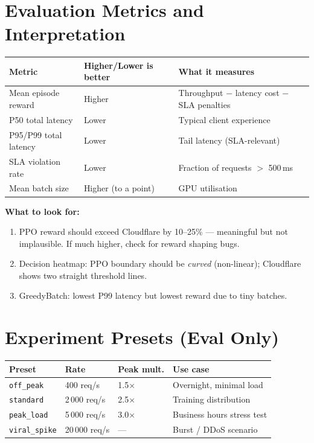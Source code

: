 \documentclass[11pt,a4paper]{article}
\begin{document}
\section{Evaluation Metrics and Interpretation}

\begin{tabular}{@{}lll@{}}
\toprule
\textbf{Metric} & \textbf{Higher/Lower is better} & \textbf{What it measures} \\
\midrule
Mean episode reward & Higher & Throughput $-$ latency cost $-$ SLA penalties \\
P50 total latency & Lower & Typical client experience \\
P95/P99 total latency & Lower & Tail latency (SLA-relevant) \\
SLA violation rate & Lower & Fraction of requests $>$ 500\,ms \\
Mean batch size & Higher (to a point) & GPU utilisation \\
\bottomrule
\end{tabular}

\medskip
\noindent\textbf{What to look for:}
\begin{enumerate}[noitemsep]
  \item PPO reward should exceed Cloudflare by 10--25\% — meaningful but not
        implausible. If much higher, check for reward shaping bugs.
  \item Decision heatmap: PPO boundary should be \emph{curved} (non-linear);
        Cloudflare shows two straight threshold lines.
  \item GreedyBatch: lowest P99 latency but lowest reward due to tiny batches.
\end{enumerate}

\section{Experiment Presets (Eval Only)}

\begin{tabular}{@{}llll@{}}
\toprule
\textbf{Preset} & \textbf{Rate} & \textbf{Peak mult.} & \textbf{Use case} \\
\midrule
\texttt{off\_peak}    & 400 req/s   & 1.5$\times$ & Overnight, minimal load \\
\texttt{standard}     & 2\,000 req/s & 2.5$\times$ & Training distribution \\
\texttt{peak\_load}   & 5\,000 req/s & 3.0$\times$ & Business hours stress test \\
\texttt{viral\_spike} & 20\,000 req/s & —          & Burst / DDoS scenario \\
\bottomrule
\end{tabular}
\end{document}
